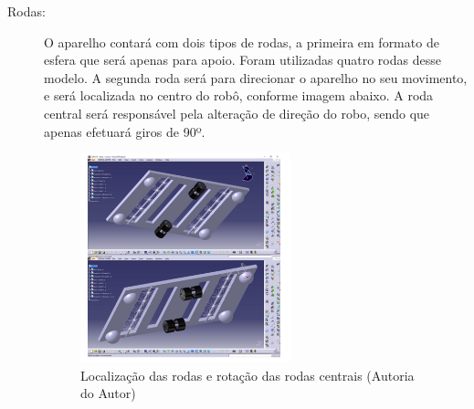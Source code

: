 \begin{description}
\item[Rodas:] O aparelho contará com dois tipos de rodas, a primeira em formato
de esfera que será apenas para apoio. Foram utilizadas quatro rodas desse modelo.
A segunda roda será para direcionar o aparelho no seu movimento, e será localizada
no centro do robô, conforme imagem abaixo. A roda central será responsável pela
alteração de direção do robo, sendo que apenas efetuará giros de  90º.
\par
\begin{figure}[h]
  \centering
  \includegraphics[width=0.6\textwidth]{figures/wheels.png}
  \caption{Localização das rodas e rotação das rodas centrais (\textsf{Autoria do Autor})}
  \label{fig:wheels}
\end{figure}
\FloatBarrier


\end{description}
